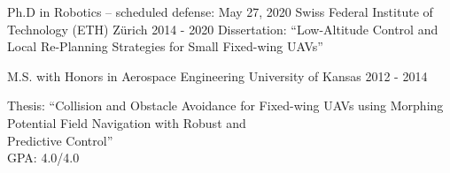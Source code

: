 

\begin{cventries}

  \cventry
    {Ph.D in Robotics -- scheduled defense: May 27, 2020} %
    {Swiss Federal Institute of Technology (ETH) Z\"{u}rich} %
    {} %
    {2014 - 2020} %
    {Dissertation: ``Low-Altitude Control and Local Re-Planning Strategies for Small Fixed-wing UAVs''}
    
  \cventry
    {M.S. with Honors in Aerospace Engineering} %
    {University of Kansas} %
    {} %
    {2012 - 2014} %
    {\parbox{\linewidth}{\vspace*{0.1cm}
		Thesis: ``Collision and Obstacle Avoidance for Fixed-wing UAVs using Morphing Potential Field Navigation with Robust and \\	
		\hspace*{1cm} Predictive Control''\\
        GPA: 4.0/4.0
        }
    }
    

\end{cventries}

